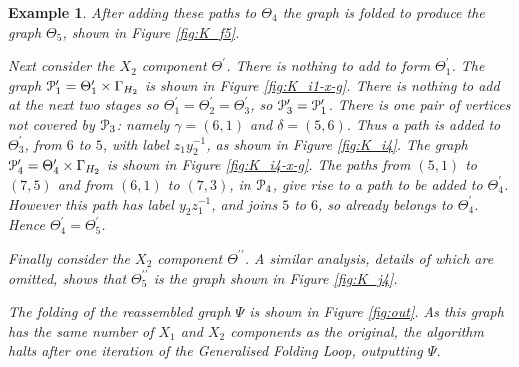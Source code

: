 \documentclass[a4paper,12pt]{article}
\newcommand{\G}{\Gamma }
\newcommand{\g}{\gamma }
\renewcommand{\d}{\delta }
\newcommand{\T}{\Theta }
\newcommand{\cP}{{\cal{P}}}
\newtheorem{exam}[theorem]{Example}
\newenvironment{example}{\begin{exam} \rm}{\end{exam}}
\numberwithin{equation}{section}
\numberwithin{figure}{section}
\begin{document}
\begin{example}
 After adding these paths to $\T_4$ the graph is folded to
produce the graph $\T_5$, shown in Figure \ref{fig:K_f5}.


Next consider the $X_2$ component $\T^\prime$. There is nothing to
add to form $\T^\prime_1$. The graph $\cP_1^\prime=\T_1^\prime
\times \G_{H_2}$ is shown in Figure \ref{fig:K_i1-x-g}. There is
nothing to add at the next two  stages so
$\T_1^\prime=\T_2^\prime=\T_3^\prime$, so
$\cP_3^\prime=\cP_1^\prime$. There is one pair of vertices not
covered by $\cP_3$: namely $\g=(6,1)$ and $\d=(5,6)$. Thus a path
is added to $\T_3^\prime$, from $6$ to $5$, with label
$z_1y_2^{-1}$, as shown in Figure \ref{fig:K_i4}. The graph
 $\cP_4^\prime=\T_4^\prime \times \G_{H_2}$ is shown in Figure \ref{fig:K_i4-x-g}. The paths
from $(5,1)$ to $(7,5)$ and from $(6,1)$ to $(7,3)$, in $\cP_4$, give rise to a path to be
added to $\T_4^\prime$. However this path has label $y_2z_1^{-1}$, and joins $5$ to $6$, so already
belongs to $\T_4^\prime$. Hence $\T_4^\prime=\T_5^\prime$.

Finally consider the $X_2$ component $\T^{\prime\prime}$. A similar analysis, details of which
are omitted, shows that $ \T^{\prime\prime}_5$ is the graph shown in Figure \ref{fig:K_j4}.

The folding of the reassembled graph $\Psi$ is shown in  Figure
\ref{fig:out}.  As this graph has the same number of $X_1$ and $X_2$ components as the original,
the algorithm halts after one iteration of the Generalised Folding Loop, outputting $\Psi$.

\end{example}
\end{document}
